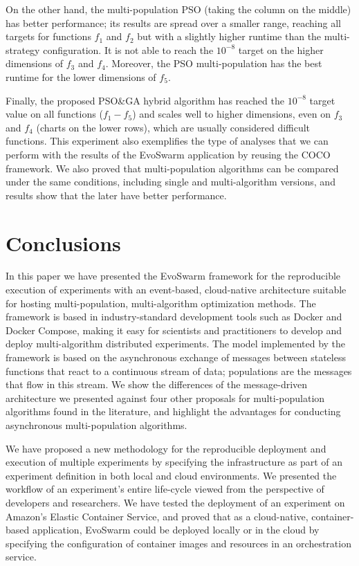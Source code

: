 \documentclass[review]{elsarticle}
\begin{document}
On the other hand, the multi-population PSO (taking the column on the middle) 
has better performance; its results are spread over a smaller range,
reaching all targets for functions $f_1$ and $f_2$ but with a slightly higher
runtime than the multi-strategy configuration. It is not able to reach the
$10^{-8}$ target on the higher dimensions of $f_3$ and $f_4$. Moreover, the PSO
multi-population has the best runtime for the lower dimensions of $f_5$.

Finally, the proposed PSO\&GA hybrid algorithm has reached the $10^{-8}$ target
value on all functions ($f_1-f_5$) and scales well to higher dimensions, even on
$f_3$ and $f_4$ (charts on the lower rows), which are usually considered
difficult functions. This experiment also exemplifies the type of analyses that
we can perform with the results of the EvoSwarm application by reusing the COCO framework.
We also proved that multi-population algorithms can be compared under the same 
conditions, including single and multi-algorithm versions, and results show 
that the later have better performance.


\section{Conclusions} 
\label{conclusions}

In this paper we have presented the EvoSwarm framework for 
the reproducible execution of experiments with an event-based, cloud-native architecture 
suitable for hosting multi-population, multi-algorithm optimization
methods. 
The framework is based in industry-standard development
tools such as Docker and Docker Compose, making it easy for scientists and practitioners to develop and deploy
multi-algorithm distributed experiments. The model implemented by the
framework is based on the asynchronous
exchange of messages between stateless functions that react to a continuous
stream of data; populations are the messages that flow in this stream. We show the differences of the message-driven architecture we presented against
four other proposals for multi-population algorithms found in the literature, and highlight the 
advantages for conducting asynchronous multi-population algorithms.

We have proposed a new methodology for the reproducible deployment and execution of
multiple experiments by specifying the infrastructure as part of an experiment
definition in both local and cloud environments. We presented the workflow of an
experiment's entire life-cycle viewed from the perspective of developers and
researchers. 
We have tested the deployment of an experiment on Amazon's Elastic
Container Service, and proved that as a cloud-native, container-based application,
EvoSwarm could be deployed locally or in the cloud by specifying the configuration 
of container images and resources in an orchestration service.
\end{document}
